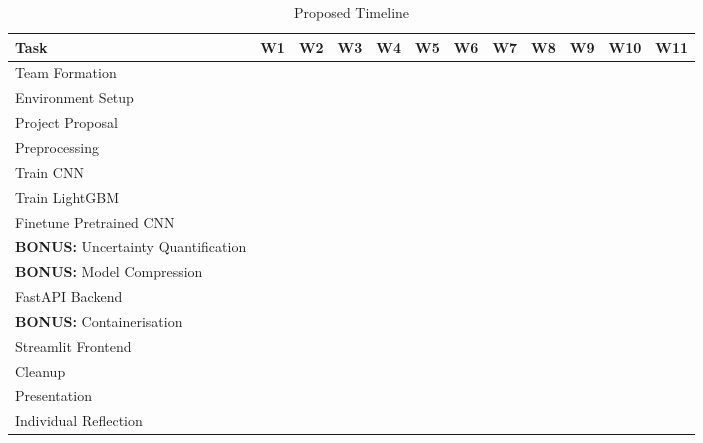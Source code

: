 \documentclass{article}
\begin{document}
\begin{table}[!h]
    \centering
    \begin{tabularx}{\linewidth}{|l||X|X|X|X|X|X|X|X|X|X|X|}
        \hline
        \textbf{Task} & \textbf{W1} & \textbf{W2} & \textbf{W3} & \textbf{W4} & \textbf{W5} & \textbf{W6} & \textbf{W7} & \textbf{W8} & \textbf{W9} & \textbf{W10} & \textbf{W11} \\
        \hline
        \hline
        Team Formation & \cellcolor{black} & & & & & & & & & & \\
        \hline
        Environment Setup & \cellcolor{black} & & & & & & & & & & \\
        \hline
        Project Proposal & \cellcolor{black} & \cellcolor{black} & & & & & & & & &\\
        \hline
        Preprocessing & & \cellcolor{black} & \cellcolor{black} & & & & & & & & \\
        \hline
        Train CNN & & & \cellcolor{black} & & & & & & & & \\
        \hline
        Train LightGBM & & & \cellcolor{black} & & & & & & & & \\
        \hline
        Finetune Pretrained CNN & & & & \cellcolor{black} & \cellcolor{black} & & & & & & \\
        \hline
        \textbf{BONUS:} Uncertainty Quantification & & & & \cellcolor{black} & \cellcolor{black} & & & & & & \\
        \hline
        \textbf{BONUS:} Model Compression & & & & & \cellcolor{black} & \cellcolor{black} & & & & & \\
        \hline
        FastAPI Backend & & & & & \cellcolor{black} & \cellcolor{black} & & & & & \\
        \hline
        \textbf{BONUS:} Containerisation & & & & & & \cellcolor{black} & \cellcolor{black} & & & & \\
        \hline
        Streamlit Frontend & & & & & & & \cellcolor{black} & \cellcolor{black} & & & \\
        \hline
        Cleanup & & & & & & & & \cellcolor{black} & \cellcolor{black} & & \\
        \hline
        Presentation & & & & & & & & \cellcolor{black} & \cellcolor{black} & & \\
        \hline
        Individual Reflection & & & & & & & & & & \cellcolor{black} & \cellcolor{black} \\
        \hline
    \end{tabularx}
    \caption{Proposed Timeline}
    \label{tab:timeline}
\end{table}
\end{document}
